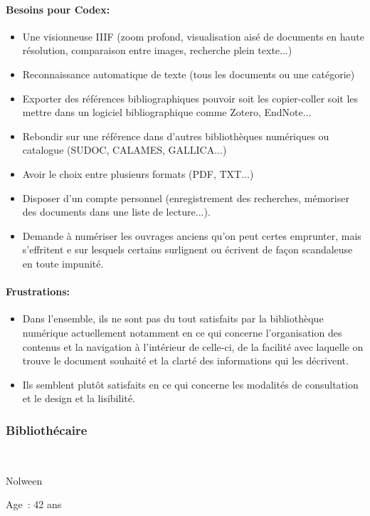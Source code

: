 \paragraph*{Besoins pour Codex:}
\begin{itemize}
	\item Une visionneuse IIIF (zoom profond, visualisation aisé de documents en haute résolution, comparaison entre images, recherche plein texte...)
\item Reconnaissance automatique de texte (tous les documents ou une catégorie)
\item Exporter des références bibliographiques pouvoir soit les copier-coller soit les mettre dans un logiciel bibliographique comme Zotero, EndNote...
\item Rebondir sur une référence dans d'autres bibliothèques numériques ou catalogue (SUDOC, CALAMES, GALLICA...)
\item Avoir le choix entre plusieurs formats (PDF, TXT...)
\item Disposer d'un compte personnel (enregistrement des recherches, mémoriser des documents dans une liste de lecture...).
\item Demande à numériser les ouvrages anciens qu’on peut certes emprunter, mais s’effritent e sur lesquels certains surlignent ou écrivent de façon scandaleuse en toute impunité.
\end{itemize}
\paragraph*{Frustrations:}
\begin{itemize}
	\item Dans l’ensemble, ils ne sont pas du tout satisfaits par la bibliothèque numérique actuellement notamment en ce qui concerne l’organisation des contenus et la navigation à l’intérieur de celle-ci, de la facilité avec laquelle on trouve le document souhaité et la clarté des informations qui les décrivent.
\item Ils semblent plutôt satisfaits en ce qui concerne les modalités de consultation et le design et la lisibilité.
\end{itemize}


\subsubsection*{Bibliothécaire} 
Nolween
 
Age : 42 ans

